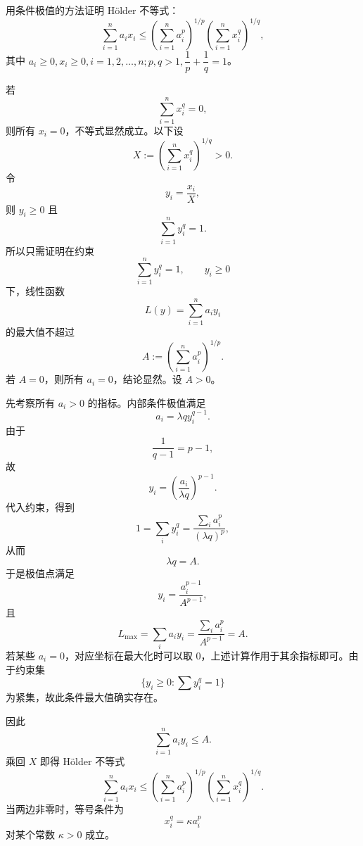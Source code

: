 \begin{xreferenceproblem}[7]
用条件极值的方法证明 Hölder 不等式：
  \[
    \sum_{i=1}^n a_ix_i
    \le\left(\sum_{i=1}^n a_i^p\right)^{1/p}
    \left(\sum_{i=1}^n x_i^q\right)^{1/q},
  \]
  其中 $a_i\ge0,x_i\ge0,i=1,2,\ldots,n;p,q>1,\dfrac1p+\dfrac1q=1$。
\end{xreferenceproblem}
\begin{xsolution}
若
\[
  \sum_{i=1}^n x_i^q=0,
\]
则所有 $x_i=0$，不等式显然成立。以下设
\[
  X:=\left(\sum_{i=1}^n x_i^q\right)^{1/q}>0.
\]
令
\[
  y_i=\frac{x_i}{X},
\]
则 $y_i\ge0$ 且
\[
  \sum_{i=1}^n y_i^q=1.
\]
所以只需证明在约束
\[
  \sum_{i=1}^n y_i^q=1,
  \qquad y_i\ge0
\]
下，线性函数
\[
  L(y)=\sum_{i=1}^n a_i y_i
\]
的最大值不超过
\[
  A:=\left(\sum_{i=1}^n a_i^p\right)^{1/p}.
\]
若 $A=0$，则所有 $a_i=0$，结论显然。设 $A>0$。

先考察所有 $a_i>0$ 的指标。内部条件极值满足
\[
  a_i=\lambda q y_i^{q-1}.
\]
由于
\[
  \frac1{q-1}=p-1,
\]
故
\[
  y_i=\left(\frac{a_i}{\lambda q}\right)^{p-1}.
\]
代入约束，得到
\[
  1=\sum_i y_i^q
  =\frac{\sum_i a_i^p}{(\lambda q)^p},
\]
从而
\[
  \lambda q=A.
\]
于是极值点满足
\[
  y_i=\frac{a_i^{p-1}}{A^{p-1}},
\]
且
\[
  L_{\max}
  =\sum_i a_i y_i
  =\frac{\sum_i a_i^p}{A^{p-1}}=A.
\]
若某些 $a_i=0$，对应坐标在最大化时可以取 $0$，上述计算作用于其余指标即可。由于约束集
\[
  \{y_i\ge0:\sum y_i^q=1\}
\]
为紧集，故此条件最大值确实存在。

因此
\[
  \sum_{i=1}^n a_i y_i\le A.
\]
乘回 $X$ 即得 Hölder 不等式
\[
  \sum_{i=1}^n a_i x_i
  \le
  \left(\sum_{i=1}^n a_i^p\right)^{1/p}
  \left(\sum_{i=1}^n x_i^q\right)^{1/q}.
\]
当两边非零时，等号条件为
\[
  x_i^q=\kappa a_i^p
\]
对某个常数 $\kappa>0$ 成立。
\end{xsolution}


